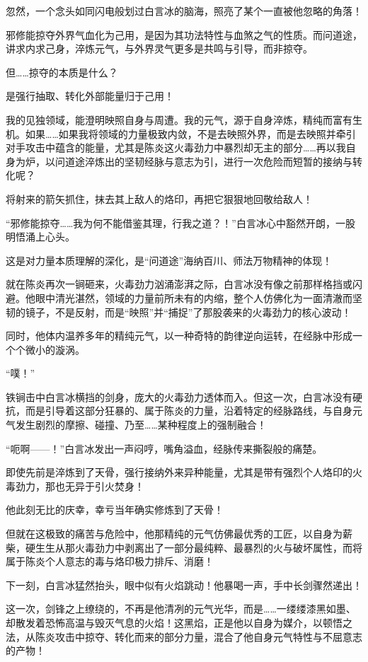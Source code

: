 忽然，一个念头如同闪电般划过白言冰的脑海，照亮了某个一直被他忽略的角落！

邪修能掠夺外界气血化为己用，是因为其功法特性与血煞之气的性质。而问道途，讲求内求己身，淬炼元气，与外界灵气更多是共鸣与引导，而非掠夺。

但……掠夺的本质是什么？

是强行抽取、转化外部能量归于己用！

我的见独领域，能澄明映照自身与周遭。我的元气，源于自身淬炼，精纯而富有生机。如果……如果我将领域的力量极致内敛，不是去映照外界，而是去映照并牵引对手攻击中蕴含的能量，尤其是陈炎这火毒劲力中暴烈却无主的部分……再以我自身为炉，以问道途淬炼出的坚韧经脉与意志为引，进行一次危险而短暂的接纳与转化呢？

将射来的箭矢抓住，抹去其上敌人的烙印，再把它狠狠地回敬给敌人！

“邪修能掠夺……我为何不能借鉴其理，行我之道？！”白言冰心中豁然开朗，一股明悟涌上心头。

这是对力量本质理解的深化，是“问道途”海纳百川、师法万物精神的体现！

就在陈炎再次一锏砸来，火毒劲力汹涌澎湃之际，白言冰没有像之前那样格挡或闪避。他眼中清光湛然，领域的力量前所未有的内缩，整个人仿佛化为一面清澈而坚韧的镜子，不是反射，而是“映照”并“捕捉”了那股袭来的火毒劲力的核心波动！

同时，他体内温养多年的精纯元气，以一种奇特的韵律逆向运转，在经脉中形成一个个微小的漩涡。

“噗！”

铁锏击中白言冰横挡的剑身，庞大的火毒劲力透体而入。但这一次，白言冰没有硬抗，而是引导着这部分狂暴的、属于陈炎的力量，沿着特定的经脉路线，与自身元气发生剧烈的摩擦、碰撞、乃至……某种程度上的强制融合！

“呃啊——！”白言冰发出一声闷哼，嘴角溢血，经脉传来撕裂般的痛楚。

即使先前是淬炼到了天骨，强行接纳外来异种能量，尤其是带有强烈个人烙印的火毒劲力，那也无异于引火焚身！

他此刻无比的庆幸，幸亏当年确实修炼到了天骨！

但就在这极致的痛苦与危险中，他那精纯的元气仿佛最优秀的工匠，以自身为薪柴，硬生生从那火毒劲力中剥离出了一部分最纯粹、最暴烈的火与破坏属性，而将属于陈炎个人意志的毒与烙印极力排斥、消磨！

下一刻，白言冰猛然抬头，眼中似有火焰跳动！他暴喝一声，手中长剑骤然递出！

这一次，剑锋之上缭绕的，不再是他清冽的元气光华，而是……一缕缕漆黑如墨、却散发着恐怖高温与毁灭气息的火焰！这黑焰，正是他以自身为媒介，以顿悟之法，从陈炎攻击中掠夺、转化而来的部分力量，混合了他自身元气特性与不屈意志的产物！

